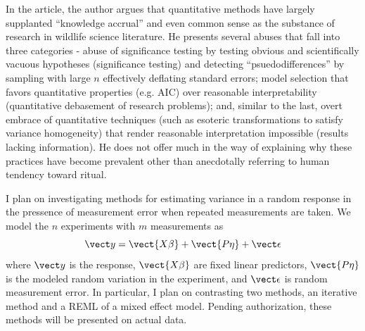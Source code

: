 \documentclass{homework}
\begin{document}

\begin{solution}
In the article, the author argues that quantitative methods have largely supplanted ``knowledge
accrual'' and even common sense as the substance of research in wildlife science literature.  He
presents several abuses that fall into three categories -
abuse of significance testing by testing obvious and scientifically vacuous
hypotheses (significance testing) and detecting ``psuedodifferences'' by sampling with large $n$ effectively deflating standard errors; model selection that favors quantitative properties (e.g. AIC) over reasonable interpretability (quantitative debasement of research problems); and, similar to the last, overt embrace of quantitative techniques (such as esoteric transformations to satisfy variance homogeneity) that render reasonable interpretation impossible (results lacking information).  He does not offer much in the way of explaining why these practices have become prevalent other than anecdotally referring to human tendency toward ritual.
\end{solution}


I plan on investigating methods for estimating variance in a random response in the pressence of measurement error when repeated measurements are taken.  We model the $n$ experiments with $m$ measurements as 
$$
  \vect y = \vect{X\beta} + \vect{P\eta} + \vect \epsilon
$$
where $\vect y$ is the response, $\vect{X\beta}$ are fixed linear predictors,
$\vect{P\eta}$ is the modeled random variation in the experiment, and $\vect
\epsilon$ is random measurement error.  In
particular, I plan on contrasting two methods, an iterative method and a REML
of a mixed effect model.  Pending authorization, these methods will be
presented on actual data.
\end{document}
